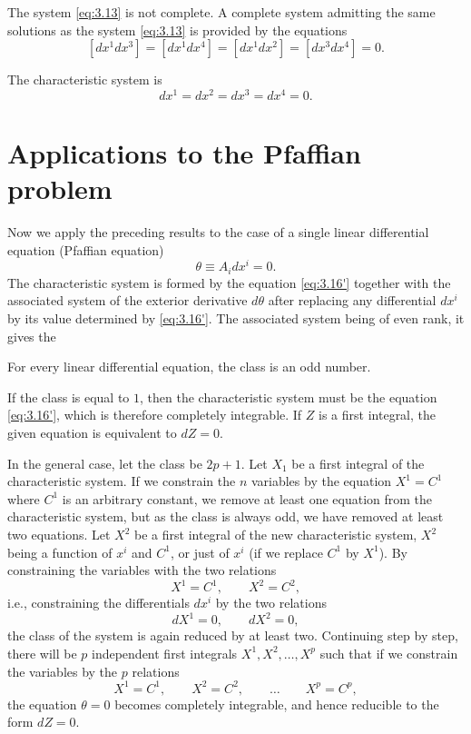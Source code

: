 The system \eqref{eq:3.13} is not complete. A complete system admitting the same solutions as the system \eqref{eq:3.13} is provided by the equations
\begin{equation}
  \label{eq:3.15}
  [dx^{1}dx^{3}]=[dx^{1}dx^{4}]=[dx^{1}dx^{2}]=[dx^{3}dx^{4}]=0.
\end{equation}

The characteristic system is
\[
dx^{1}=dx^{2}=dx^{3}=dx^{4}=0.
\]

\section{Applications to the Pfaffian problem}
\label{sec:appl-pfaff-probl}

\fsec Now we apply the preceding results to the case of a single linear differential equation (Pfaffian equation)
\begin{equation}
  \label{eq:3.16'}
  \theta\equiv A_{i}dx^{i}=0.
\end{equation}
The characteristic system is formed by the equation \eqref{eq:3.16'} together with the associated system of the exterior derivative $d\theta$ after replacing any differential $dx^{i}$ by its value determined by \eqref{eq:3.16'}. The associated system being of even rank, it gives the

\begin{thm*}
  For every linear differential equation, the class is an odd number.
\end{thm*}

If the class is equal to $1$, then the characteristic system must be the equation \eqref{eq:3.16'}, which is therefore completely integrable. If $Z$ is a first integral, the given equation is equivalent to $dZ=0$.

In the general case, let the class be $2p+1$. Let $X_{1}$ be a  first integral of the characteristic system. If we constrain the $n$ variables by the equation $X^{1}=C^{1}$ where $C^{1}$ is an arbitrary constant, we remove at least one equation from the characteristic system, but as the class is always odd, we have removed at least two equations.  Let $X^{2}$ be a first integral of the new characteristic system, $X^{2}$ being a function of $x^{i}$ and $C^{1}$, or just of $x^{i}$ (if we replace $C^{1}$ by $X^{1}$). By constraining the variables with the two relations
\[
X^{1}=C^{1},\qquad X^{2}=C^{2},
\]
{i.e.}, constraining the differentials $dx^{i}$ by the two relations
\[
dX^{1}=0,\qquad dX^{2}=0,
\]
the class of the system is again reduced by at least two. Continuing step by step,  there will be $p$ independent first integrals $X^{1},X^{2},\dots,X^{p}$ such that if we constrain the variables by the $p$ relations
\[
X^{1}=C^{1},\qquad X^{2}=C^{2},\qquad\dots\qquad X^{p}=C^{p},
\]
the equation $\theta=0$ becomes completely integrable, and hence reducible to the form $dZ=0$.

